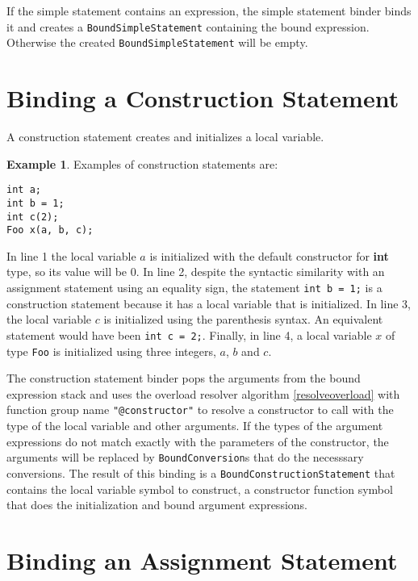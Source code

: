 \documentclass[a4paper,oneside,11pt]{book}
\theoremstyle{definition}
\newtheorem{exmp}{Example}[section]
\begin{document}
If the simple statement contains an expression, the simple statement binder binds it and creates a \verb|BoundSimpleStatement| containing the
bound expression. Otherwise the created \verb|BoundSimpleStatement| will be empty.

\section{Binding a Construction Statement}

A construction statement creates and initializes a local variable.

\begin{exmp} Examples of construction statements are:
\lstset{language=Cmajor}
\begin{lstlisting}[frame=trBL]
int a;
int b = 1;
int c(2);
Foo x(a, b, c);
\end{lstlisting}

In line 1 the local variable $a$ is initialized with the default constructor for \textbf{int} type, so its value will be 0.
In line 2, despite the syntactic similarity with an assignment statement using an equality sign, the statement \verb|int b = 1;|
is a construction statement because it has a local variable that is initialized.
In line 3, the local variable $c$ is initialized using the parenthesis syntax. An equivalent statement would have been \verb|int c = 2;|.
Finally, in line 4, a local variable $x$ of type \verb|Foo| is initialized using three integers, $a$, $b$ and $c$.
\end{exmp}

The construction statement binder pops the arguments from the bound expression stack
and uses the overload resolver algorithm \ref{resolveoverload} with function group name \verb|"@constructor"|
to resolve a constructor to call with the type of the local variable and other arguments.
If the types of the argument expressions do not match exactly with the parameters of the
constructor, the arguments will be replaced by \verb|BoundConversion|s that do the necesssary conversions.
The result of this binding is a \verb|BoundConstructionStatement| that contains the local variable symbol to construct,
a constructor function symbol that does the initialization and bound argument expressions.

\section{Binding an Assignment Statement}
\end{document}
